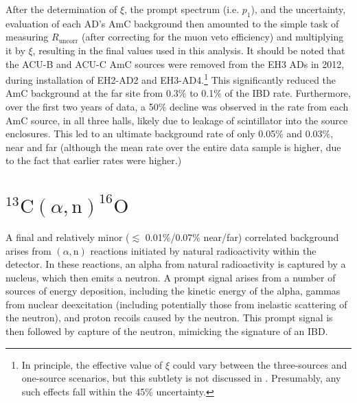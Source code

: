 \documentclass[../thesis.tex]{subfiles}
\begin{document}
After the determination of $\xi$, the prompt spectrum (i.e. $p_1$), and the
uncertainty, evaluation of each AD's AmC background then amounted to the simple
task of measuring $R_{\mathrm{uncorr}}$ (after correcting for the muon veto
efficiency) and multiplying it by $\xi$, resulting in the final values used in
this analysis. It should be noted that the ACU-B and ACU-C AmC sources were
removed from the EH3 ADs in 2012, during installation of EH2-AD2 and
EH3-AD4.\footnote{In principle, the effective value of $\xi$ could vary between
  the three-sources and one-source scenarios, but this subtlety is not discussed
  in \cite{Gu_2016}. Presumably, any such effects fall within the 45\%
  uncertainty.} This significantly reduced the AmC background at the far site
from 0.3\% to 0.1\% of the IBD rate. Furthermore, over the first two years of
data, a 50\% decline was observed in the rate from each AmC source, in all three
halls, likely due to leakage of scintillator into the source enclosures. This
led to an ultimate background rate of only 0.05\% and 0.03\%, near and far
(although the mean rate over the entire data sample is higher, due to the fact
that earlier rates were higher.)

\newcommand\alphN{(\alpha,\mathrm{n})} \newcommand\CanO{^{13}\mathrm{C}(\alpha,
  \mathrm{n})^{16}\mathrm{O}}

\section{$\CanO$}

A final and relatively minor ($\lesssim$ 0.01\%/0.07\% near/far) correlated
background arises from $\alphN$ reactions initiated by natural radioactivity
within the detector. In these reactions, an alpha from natural radioactivity is
captured by a nucleus, which then emits a neutron. A prompt signal arises from a
number of sources of energy deposition, including the kinetic energy of the
alpha, gammas from nuclear deexcitation (including potentially those from
inelastic scattering of the neutron), and proton recoils caused by the
neutron. This prompt signal is then followed by capture of the neutron,
mimicking the signature of an IBD.
\end{document}
